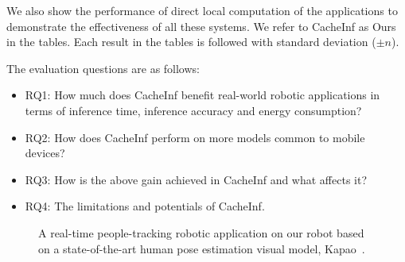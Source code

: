 We also show the performance of direct local computation of the applications to demonstrate the effectiveness of all these systems.
We refer to CacheInf as Ours in the tables.
Each result in the tables is followed with standard deviation ($\pm n$).


The evaluation questions are as follows:
\begin{itemize}
    \item RQ1: How much does CacheInf benefit real-world robotic applications in terms of inference time, inference accuracy and energy consumption?
    \item RQ2: How does CacheInf perform on more models common to mobile devices?
    \item RQ3: How is the above gain achieved in CacheInf and what affects it?
    \item RQ4: The limitations and potentials of CacheInf.
\end{itemize}

\begin{figure}[!t]
    \centering
    \caption{A real-time people-tracking robotic application on our robot based on a state-of-the-art human pose estimation visual model, Kapao~\cite{kapao}.}
    \label{fig:kapao}
\end{figure}

